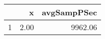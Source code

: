 \begin{table}[h]
\centering
\begin{tabular}{rrr}
  \hline
 & x & avgSampPSec \\ 
  \hline
1 & 2.00 & 9962.06 \\ 
   \hline
\end{tabular}
\end{table}
